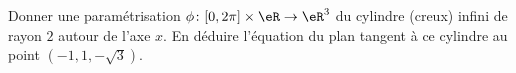 
\begin{exercice}\label{exoOutilsMath-0114}

    Donner une paramétrisation $\phi\colon \mathopen[ 0 , 2\pi \mathclose]\times \eR\to \eR^3$ du cylindre (creux) infini de rayon $2$ autour de l'axe $x$. En déduire l'équation du plan tangent à ce cylindre au point $(-1,1,-\sqrt{3})$.

\end{exercice}
